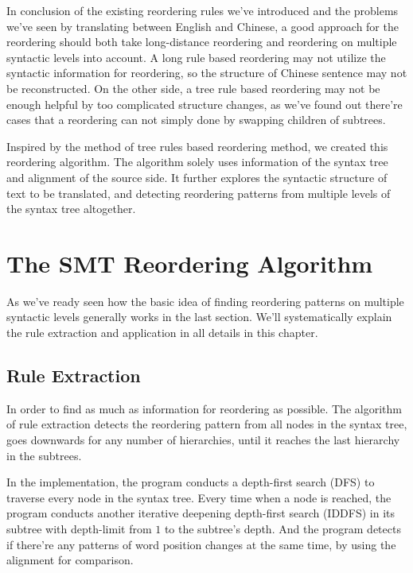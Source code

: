 In conclusion of the existing reordering rules we've introduced and the problems we've seen by translating between English and Chinese, a good approach for the reordering should both take long-distance reordering and reordering on multiple syntactic levels into account. A long rule based reordering may not utilize the syntactic information for reordering, so the structure of Chinese sentence may not be reconstructed. On the other side, a tree rule based reordering may not be enough helpful by too complicated structure changes, as we've found out there're cases that a reordering can not simply done by swapping children of subtrees. 

Inspired by the method of tree rules based reordering method, we created this reordering algorithm. The algorithm solely uses information of the syntax tree and alignment of the source side. It further explores the syntactic structure of text to be translated, and detecting reordering patterns from multiple levels of the syntax tree altogether.

\section{The SMT Reordering Algorithm}
\label{ch:ReorderingApproach:sec:Algorithm}

As we've ready seen how the basic idea of finding reordering patterns on multiple syntactic levels generally works in the last section. We'll systematically explain the rule extraction and application in all details in this chapter.

\subsection{Rule Extraction}

In order to find as much as information for reordering as possible. The algorithm of rule extraction detects the reordering pattern from all nodes in the syntax tree, goes downwards for any number of hierarchies, until it reaches the last hierarchy in the subtrees.

In the implementation, the program conducts a depth-first search (DFS) to traverse every node in the syntax tree. Every time when a node is reached, the program conducts another iterative deepening depth-first search (IDDFS) in its subtree with depth-limit from $1$ to the subtree's depth. And the program detects if there're any patterns of word position changes at the same time, by using the alignment for comparison.

